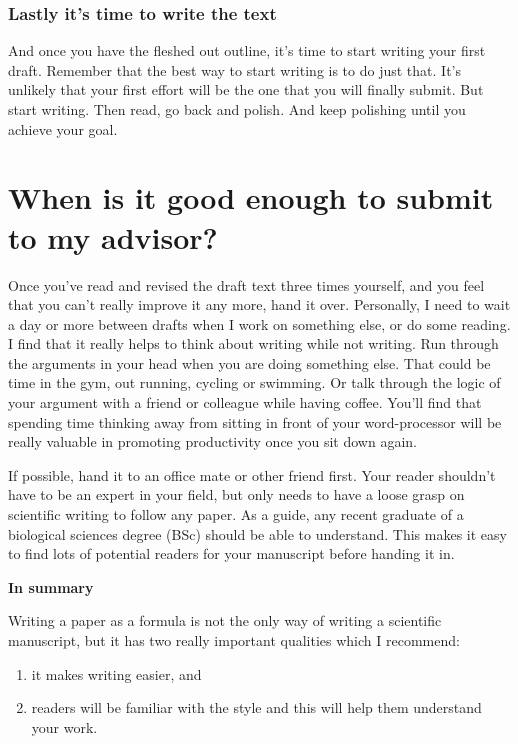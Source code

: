 \documentclass[
]{krantz}
\providecommand{\tightlist}{%
  \setlength{\itemsep}{0pt}\setlength{\parskip}{0pt}}
\begin{document}
\hypertarget{lastly-its-time-to-write-the-text}{%
\subsubsection{Lastly it's time to write the text}\label{lastly-its-time-to-write-the-text}}

And once you have the fleshed out outline, it's time to start writing your first draft. Remember that the best way to start writing is to do just that. It's unlikely that your first effort will be the one that you will finally submit. But start writing. Then read, go back and polish. And keep polishing until you achieve your goal.

\hypertarget{goodenough}{%
\section{When is it good enough to submit to my advisor?}\label{goodenough}}

Once you've read and revised the draft text three times yourself, and you feel that you can't really improve it any more, hand it over. Personally, I need to wait a day or more between drafts when I work on something else, or do some reading. I find that it really helps to think about writing while not writing. Run through the arguments in your head when you are doing something else. That could be time in the gym, out running, cycling or swimming. Or talk through the logic of your argument with a friend or colleague while having coffee. You'll find that spending time thinking away from sitting in front of your word-processor will be really valuable in promoting productivity once you sit down again.

If possible, hand it to an office mate or other friend first. Your reader shouldn't have to be an expert in your field, but only needs to have a loose grasp on scientific writing to follow any paper. As a guide, any recent graduate of a biological sciences degree (BSc) should be able to understand. This makes it easy to find lots of potential readers for your manuscript before handing it in.

\textbf{In summary}

Writing a paper as a formula is not the only way of writing a scientific manuscript, but it has two really important qualities which I recommend:

\begin{enumerate}
\def\labelenumi{\arabic{enumi}.}
\tightlist
\item
  it makes writing easier, and
\item
  readers will be familiar with the style and this will help them understand your work.
\end{enumerate}
\end{document}

